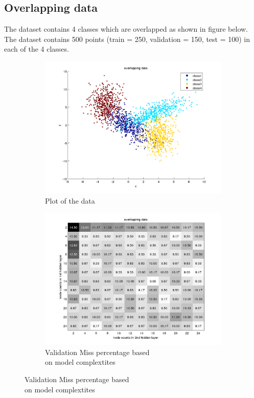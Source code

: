 \documentclass[fleqn]{article}
\begin{document}
\newpage
\subsection{Overlapping data}

The dataset contains 4 classes which are overlapped as shown in figure below. 
The dataset contains 500 points (train = 250, validation = 150, test = 100) in each of the 4 classes.

\begin{figure}[!ht]
\begin{subfigure}{.5\textwidth}
  \caption{Plot of the data}
\includegraphics[scale=0.4]{pics/overlapping_data/dataPlot}
\end{subfigure}
\begin{subfigure}{.5\textwidth}
  \caption{Validation Miss percentage based\\ on model complextites}
\includegraphics[scale=0.2]{pics/overlapping_data/overlapping data_validationerror}
\end{subfigure}
\end{figure}
\end{document}
